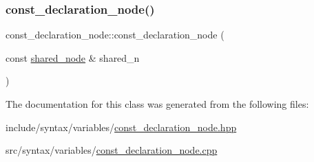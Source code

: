 \subsubsection{\texorpdfstring{const\+\_\+declaration\+\_\+node()}{const\_declaration\_node()}}
{\footnotesize\ttfamily const\+\_\+declaration\+\_\+node\+::const\+\_\+declaration\+\_\+node (\begin{DoxyParamCaption}\item[{const \hyperlink{namespacejawe_a3f307481d921b6cbb50cc8511fc2b544}{shared\+\_\+node} \&}]{shared\+\_\+n }\end{DoxyParamCaption})}



The documentation for this class was generated from the following files\+:\begin{DoxyCompactItemize}
\item 
include/syntax/variables/\hyperlink{const__declaration__node_8hpp}{const\+\_\+declaration\+\_\+node.\+hpp}\item 
src/syntax/variables/\hyperlink{const__declaration__node_8cpp}{const\+\_\+declaration\+\_\+node.\+cpp}\end{DoxyCompactItemize}
